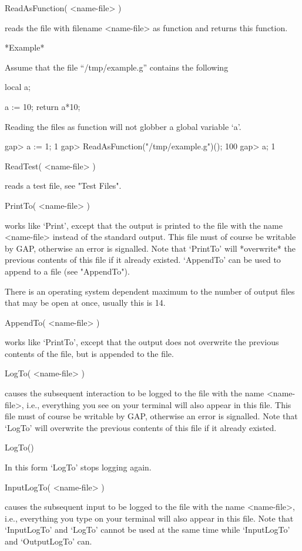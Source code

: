 \>ReadAsFunction( <name-file> )

reads the  file  with filename <name-file> as  function  and returns this
function.

*Example*

Assume that the file ``/tmp/example.g'' contains the following

\begintt
    local a;

    a := 10;
    return a*10;
\endtt

Reading the files as function will not globber a global variable `a'.

\begintt
    gap> a := 1;
    1
    gap> ReadAsFunction("/tmp/example.g")();
    100
    gap> a;
    1
\endtt

\>ReadTest( <name-file> )

reads a test file, see "Test Files".

\>PrintTo( <name-file> )

works like `Print',  except that the output  is printed to the  file with
the name <name-file>  instead of the standard output.   This file must of
course be writable by  GAP, otherwise an  error is signalled.  Note  that
`PrintTo' will  *overwrite*  the  previous contents  of  this file  if it
already existed.  `AppendTo'  can   be used to   append to  a file   (see
"AppendTo").
    
There is an  operating system dependent maximum  to the number  of output
files that may be open at once, usually this is 14.

\>AppendTo( <name-file> )

works like `PrintTo',  except  that the   output does  not overwrite  the
previous contents of the file, but is appended to the file.

\>LogTo( <name-file> )

causes the subsequent interaction to be logged  to the file with the name
<name-file>, i.e., everything you  see on your  terminal will also appear
in this file.  This file must of course be writable  by GAP, otherwise an
error  is signalled.  Note  that   `LogTo'  will overwrite the   previous
contents of this file if it already existed.

\)LogTo()

In this form `LogTo' stops logging again.

\>InputLogTo( <name-file> )

causes the  subsequent  input to be   logged to the   file with  the name
<name-file>, i.e., everything you type  on your terminal will also appear
in this file.  Note that `InputLogTo'  and `LogTo' cannot  be used at the
same time while `InputLogTo' and `OutputLogTo' can.

